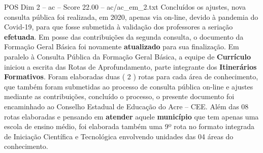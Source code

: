 \begin{textsample}{POS Dim 2 – ac – Score 22.00 – ac/ac\_em\_2.txt}
Concluídos os ajustes, nova consulta pública foi realizada, em 2020, apenas via on-line, devido à pandemia do Covid-19, para que fosse submetida à validação dos professores a seriação \textbf{efetuada}.
Em posse das contribuições da segunda consulta, o documento da Formação Geral Básica foi novamente \textbf{atualizado} para sua finalização.
Em paralelo à Consulta Pública da Formação Geral Básica, a equipe de \textbf{Currículo} iniciou a escrita das Rotas de Aprofundamento, parte integrante dos \textbf{Itinerários} \textbf{Formativos}.
Foram elaboradas duas ( 2 ) rotas para cada área de conhecimento, que também foram submetidas ao processo de consulta pública on-line e ajustes mediante as contribuições, concluído o processo, o presente documento foi encaminhado ao Conselho Estadual de Educação do Acre – CEE.
Além das 08 rotas elaboradas e pensando em \textbf{atender} aquele \textbf{município} que tem apenas uma escola de ensino médio, foi elaborada também uma 9º rota no formato integrada de Iniciação Científica e Tecnológica envolvendo unidades das 04 áreas do conhecimento.

\end{textsample}
